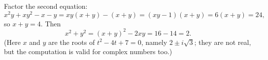 Factor the second equation:
\[
x^2y+xy^2-x-y=xy(x+y)-(x+y)=(xy-1)(x+y)=6(x+y)=24,
\]
so $x+y=4$. Then
\[
x^2+y^2=(x+y)^2-2xy=16-14=\boxed{2}.
\]
(Here $x$ and $y$ are the roots of $t^2-4t+7=0$, namely $2\pm i\sqrt3$; they are not real, but the computation is valid for complex numbers too.)
